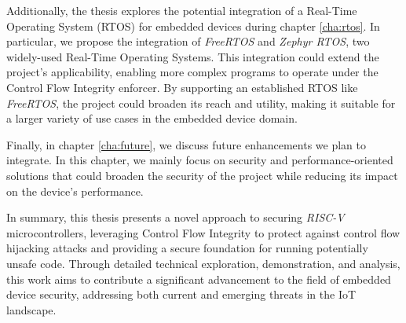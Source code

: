 Additionally, the thesis explores the potential integration of a Real-Time
Operating System (RTOS) for embedded devices during chapter \ref{cha:rtos}. In particular,
we propose the integration of \textit{FreeRTOS} and \textit{Zephyr RTOS}, two widely-used
Real-Time Operating Systems. This integration could extend the project's
applicability, enabling more complex programs to operate under the Control Flow Integrity
enforcer. By supporting an established RTOS like \textit{FreeRTOS}, the project
could broaden its reach and utility, making it suitable for a larger variety of use
cases in the embedded device domain.

Finally, in chapter \ref{cha:future}, we discuss future enhancements we plan to integrate.
In this chapter, we mainly focus on security and performance-oriented solutions that
could broaden the security of the project while reducing its impact on the device's
performance.

In summary, this thesis presents a novel approach to securing \textit{RISC-V} microcontrollers,
leveraging Control Flow Integrity to protect against control flow hijacking
attacks and providing a secure foundation for running potentially unsafe code. Through
detailed technical exploration, demonstration, and analysis, this work aims to
contribute a significant advancement to the field of embedded device security, addressing
both current and emerging threats in the IoT landscape.
